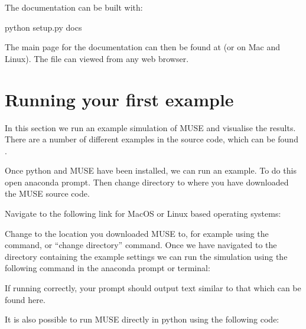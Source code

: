 \documentclass[letterpaper,10pt,english]{sphinxmanual}
\begin{document}
The documentation can be built with:

\begin{sphinxVerbatim}[commandchars=\\\{\}]
python setup.py docs
\end{sphinxVerbatim}

The main page for the documentation can then be found at
 (or  on Mac and Linux).
The file can viewed from any web browser.


\chapter{Running your first example}
\label{\detokenize{running-muse-example:Running-your-first-example}}\label{\detokenize{running-muse-example::doc}}
In this section we run an example simulation of MUSE and visualise the results. There are a number of different examples in the source code, which can be found .

Once python and MUSE have been installed, we can run an example. To do this open anaconda prompt. Then change directory to where you have downloaded the MUSE source code.

Navigate to the following link for MacOS or Linux based operating systems:


Change  to the location you downloaded MUSE to, for example  using the  command, or “change directory” command. Once we have navigated to the directory containing the example settings  we can run the simulation using the following command in the anaconda prompt or terminal:


If running correctly, your prompt should output text similar to that which can be found here.

It is also possible to run MUSE directly in python using the following code:

{
\begin{sphinxVerbatim}[commandchars=\\\{\}]
\llap{\color{nbsphinxin}[ ]:\,\hspace{\fboxrule}\hspace{\fboxsep}}   
  
\end{sphinxVerbatim}
}
\end{document}
